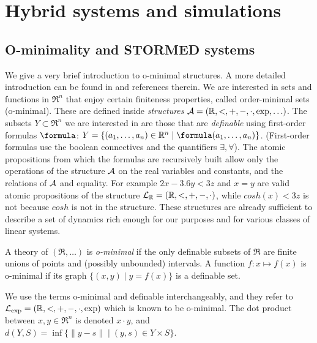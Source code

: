 \section{Hybrid systems and simulations}
\label{sec:preliminaries}



\subsection{O-minimality and STORMED systems}
\label{sec:ominimality}
We give a very brief introduction to o-minimal structures.
A more detailed introduction can be found in \cite{LaFerrierePS00_Ominimal} and references therein.
We are interested in sets and functions in $\Re^n$ that enjoy certain finiteness properties, called order-minimal sets (o-minimal).
These are defined inside \emph{structures} $\mathcal{A} = (\mathbb{R},<, +,-,\cdot,\exp,\ldots)$.
The subsets $Y \subset \Re^n$ we are interested in are those that are \emph{definable} using first-order formulas $\formula$: $Y = \{(a_1,\ldots,a_n) \in \Re^n \;|\;  \formula(a_1,\ldots,a_n)\}$.
(First-order formulas use the boolean connectives and the quantifiers $\exists,\forall$).
The atomic propositions from which the formulas are recursively built allow only the operations of the structure $\mathcal{A}$ on the real variables and constants, and the relations of $\mathcal{A}$ and equality.
For example $2x-3.6y < 3z$ and $x=y$ are valid atomic propositions of the structure $\mathcal{L}_{\mathbb{R}}=(\mathbb{R},<, +,-,\cdot)$, while $cosh(x) < 3z$ is not because $cosh$ is not in the structure.
These structures are already sufficient to describe a set of dynamics rich enough for our purposes and for various classes of linear systems.
%
\begin{defn}
	\label{defn:ominimal struct}	
	A theory of $(\Re,\ldots)$ is \emph{o-minimal} if the only definable subsets of $\Re$ are finite unions of points and (possibly unbounded) intervals.	
	A function $f:x \mapsto f(x)$ is o-minimal if its graph $\{(x,y) \;|\; y=f(x)\}$ is a definable set.
\end{defn}
We use the terms o-minimal and definable interchangeably, and they refer to $\mathcal{L}_{\exp}= (\mathbb{R},<, +,-,\cdot,\exp)$ which is known to be o-minimal.
%
The dot product between $x,y\in \Re^n$ is denoted $x \cdot y$, and $d(Y,S)=\inf \{ \|y-s\| \;|\; (y,s) \in Y\times S \}$.
